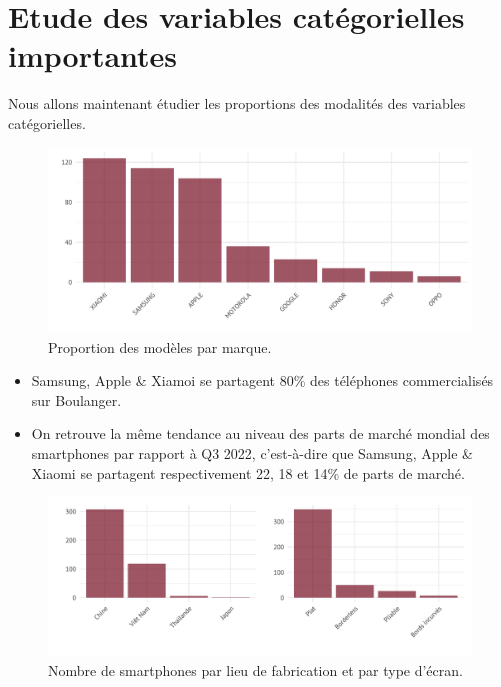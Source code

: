 \documentclass[
  12pt,
]{report}
\begin{document}
\newpage

\section{Etude des variables catégorielles
importantes}\label{etude-des-variables-catuxe9gorielles-importantes}

Nous allons maintenant étudier les proportions des modalités des
variables catégorielles.

\begin{figure}[H]

{\centering \includegraphics{report_files/figure-pdf/brand_prop-1.pdf}

}

\caption{Proportion des modèles par marque.}

\end{figure}%

\begin{itemize}
\item
  Samsung, Apple \& Xiamoi se partagent 80\% des téléphones
  commercialisés sur Boulanger.
\item
  On retrouve la même tendance au niveau des parts de marché mondial des
  smartphones par rapport à Q3 2022, c'est-à-dire que Samsung, Apple \&
  Xiaomi se partagent respectivement 22, 18 et 14\% de parts de marché.
\end{itemize}

\begin{figure}[H]

{\centering \includegraphics{report_files/figure-pdf/location_prop-1.pdf}

}

\caption{Nombre de smartphones par lieu de fabrication et par type
d'écran.}

\end{figure}%
\end{document}
